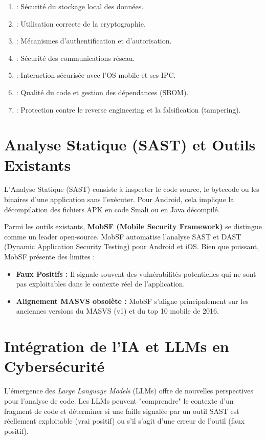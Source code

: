 \begin{tcolorbox}[infobox, title={Les 7 Catégories du MASVS v2}]
\begin{enumerate}
    \item {} : Sécurité du stockage local des données.
    \item {} : Utilisation correcte de la cryptographie.
    \item {} : Mécanismes d'authentification et d'autorisation.
    \item {} : Sécurité des communications réseau.
    \item {} : Interaction sécurisée avec l'OS mobile et ses IPC.
    \item {} : Qualité du code et gestion des dépendances (SBOM).
    \item {} : Protection contre le reverse engineering et la falsification (tampering).
\end{enumerate}
\end{tcolorbox}

\section{Analyse Statique (SAST) et Outils Existants}
L'Analyse Statique (SAST) consiste à inspecter le code source, le bytecode ou les binaires d'une application sans l'exécuter. Pour Android, cela implique la décompilation des fichiers APK en code Smali ou en Java décompilé.

Parmi les outils existants, \textbf{MobSF (Mobile Security Framework)} se distingue comme un leader open-source. MobSF automatise l'analyse SAST et DAST (Dynamic Application Security Testing) pour Android et iOS. Bien que puissant, MobSF présente des limites :
\begin{itemize}[label=\textcolor{SeverityCrit}{\faTimes}]
    \item \textbf{Faux Positifs :} Il signale souvent des vulnérabilités potentielles qui ne sont pas exploitables dans le contexte réel de l'application.
    \item \textbf{Alignement MASVS obsolète :} MobSF s'aligne principalement sur les anciennes versions du MASVS (v1) et du top 10 mobile de 2016.
\end{itemize}

\section{Intégration de l'IA et LLMs en Cybersécurité}
L'émergence des \textit{Large Language Models} (LLMs) offre de nouvelles perspectives pour l'analyse de code. Les LLMs peuvent "comprendre" le contexte d'un fragment de code et déterminer si une faille signalée par un outil SAST est réellement exploitable (vrai positif) ou s'il s'agit d'une erreur de l'outil (faux positif).

